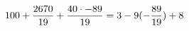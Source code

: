 \documentclass[preview]{standalone}
\begin{document}
\begin{align*}
\special{dvisvgm:raw <g id='unique000'>}100 + \frac{2670}{19} +\frac{40 \cdot -89}{19} = 3 - 9 (- \frac{89}{19}) + 8\special{dvisvgm:raw </g>}
\end{align*}
\end{document}
